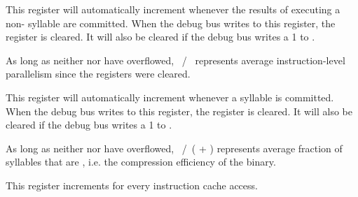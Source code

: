 
This register will automatically increment whenever the results of executing a 
non- syllable are committed. When the debug bus writes to this 
register, the register is cleared. It will also be cleared if the debug bus 
writes a 1 to .

As long as neither  nor  have overflowed,
~/~ represents average instruction-level parallelism since
the registers were cleared.

\implementation{}


This register will automatically increment whenever a  syllable is 
committed. When the debug bus writes to this register, the register is cleared. 
It will also be cleared if the debug bus writes a 1 to .

As long as neither  nor  have overflowed,
~/~( + ) represents average fraction of syllables
that are , i.e. the compression efficiency of the binary.

\implementation{}


This register increments for every instruction cache access.

\implementation{}


